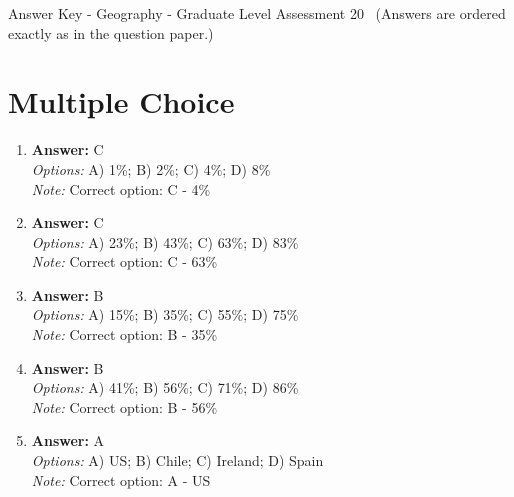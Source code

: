 \documentclass[12pt]{article}
\begin{document}
\begin{center}
Answer Key - Geography - Graduate Level Assessment 20 \
\small (Answers are ordered exactly as in the question paper.)
\end{center}

\section*{Multiple Choice}
\begin{enumerate}[label=\arabic*.]
\item \textbf{Answer:} C
\\ \textit{Options:} A) 1\%; B) 2\%; C) 4\%; D) 8\%
\\ \textit{Note:} Correct option: C - 4\%
\item \textbf{Answer:} C
\\ \textit{Options:} A) 23\%; B) 43\%; C) 63\%; D) 83\%
\\ \textit{Note:} Correct option: C - 63\%
\item \textbf{Answer:} B
\\ \textit{Options:} A) 15\%; B) 35\%; C) 55\%; D) 75\%
\\ \textit{Note:} Correct option: B - 35\%
\item \textbf{Answer:} B
\\ \textit{Options:} A) 41\%; B) 56\%; C) 71\%; D) 86\%
\\ \textit{Note:} Correct option: B - 56\%
\item \textbf{Answer:} A
\\ \textit{Options:} A) US; B) Chile; C) Ireland; D) Spain
\\ \textit{Note:} Correct option: A - US
\end{enumerate}
\end{document}

